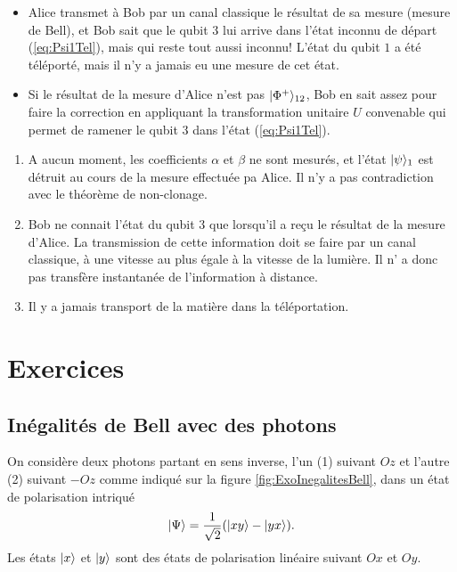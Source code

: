 \begin{itemize}
\item Alice transmet à Bob par un canal classique le résultat de sa mesure
(mesure de Bell), et Bob sait que le qubit $3$ lui arrive dans l'état inconnu
de départ (\ref{eq:Psi1Tel}), mais qui reste tout aussi inconnu! L'état du
qubit $1$ a été téléporté, mais il n'y a jamais eu une mesure de cet état.

\item Si le résultat de la mesure d'Alice n'est pas $\vert\Phi^{+}\rangle_{12}$, Bob
en sait assez pour faire la correction en appliquant la transformation unitaire
$U$ convenable qui permet de ramener le qubit $3$ dans l'état
(\ref{eq:Psi1Tel}).
\end{itemize}

\begin{remark}
\begin{enumerate}
\item A aucun moment, les coefficients $\alpha$ et $\beta$ ne sont mesurés, et
l'état $\vert\psi\rangle_{1}$ est détruit au cours de la mesure effectuée pa Alice. Il
n'y a pas contradiction avec le théorème de non-clonage.

\item Bob ne connait l'état du qubit $3$ que lorsqu'il a reçu le résultat de la
mesure d'Alice. La transmission de cette information doit se faire par un canal
classique, à une vitesse au plus égale à la vitesse de la lumière. Il n' a donc
pas transfère instantanée de l'information à distance.

\item Il y a jamais transport de la matière dans la téléportation.
\end{enumerate}
\end{remark}

\newpage

\section{Exercices}

\subsection{Inégalités de Bell avec des photons}

On considère deux photons partant en sens inverse, l'un (1) suivant $Oz$ et
l'autre (2) suivant $-Oz$ comme indiqué sur la figure
\ref{fig:ExoInegalitesBell}, dans un état de polarisation intriqué%
\begin{equation}
\vert\Psi\rangle=\frac{1}{\sqrt{2}}(\vert xy\rangle-\vert yx\rangle).
\end{equation}
Les états $\vert x\rangle$ et $\vert y\rangle$ sont des états de polarisation linéaire suivant
$Ox$ et $Oy$.

